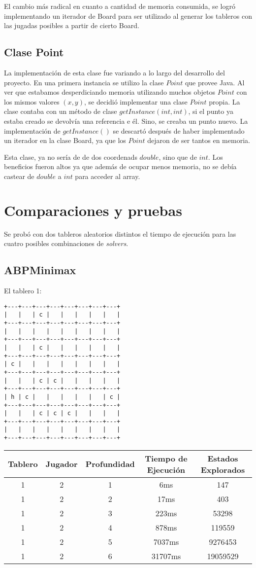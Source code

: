 \documentclass[10pt,a4paper,notitlepage]{article}
\begin{document}
    El cambio más radical en cuanto a cantidad de memoria consumida, se logró implementando un iterador de Board para ser utilizado al generar los tableros con
    las jugadas posibles a partir de cierto Board.

  \subsection{Clase Point}
    La implementación de esta clase fue variando a lo largo del desarrollo del proyecto. En una primera instancia se utilizo la clase $Point$ que provee Java.
    Al ver que estabamos desperdiciando memoria utilizando muchos objetos $Point$ con los mismos valores $(x, y)$, se decidió implementar una clase $Point$ propia.
    La clase contaba con un método de clase $getInstance(int, int)$, si el punto ya estaba creado se devolvía una referencia e él. Sino, se creaba un punto nuevo.
    La implementación de $getInstance()$ se descartó después de haber implementado un iterador en la clase Board, ya que los $Point$ dejaron de ser tantos en memoria.

    Esta clase, ya no sería de de dos coordenads $double$, sino que de $int$. Los beneficios fueron altos ya que además de ocupar menos memoria, no se debía castear de $double$ a $int$ para acceder al array.


\section{Comparaciones y pruebas}


Se probó con dos tableros aleatorios distintos el tiempo de ejecución para las cuatro posibles combinaciones de \textit{solvers}.

\subsection{ABPMinimax}
El tablero 1:
\begin{verbatim}
+---+---+---+---+---+---+---+---+
|   |   | c |   |   |   |   |   |
+---+---+---+---+---+---+---+---+
|   |   |   |   |   |   |   |   |
+---+---+---+---+---+---+---+---+
|   |   | c |   |   |   |   |   |
+---+---+---+---+---+---+---+---+
| c |   |   |   |   |   |   |   |
+---+---+---+---+---+---+---+---+
|   |   | c | c |   |   |   |   |
+---+---+---+---+---+---+---+---+
| h | c |   |   |   |   |   | c |
+---+---+---+---+---+---+---+---+
|   |   | c | c | c |   |   |   |
+---+---+---+---+---+---+---+---+
|   |   |   |   |   |   |   |   |
+---+---+---+---+---+---+---+---+
\end{verbatim}
\begin{tabular}{|c|c|c|c|c|}
\hline
Tablero & Jugador & Profundidad & Tiempo de Ejecución & Estados Explorados \\
\hline
\hline
1&2&1&6ms&147\\
\hline
1&2&2&17ms&403\\
\hline
1&2&3&223ms&53298\\
\hline
1&2&4&878ms&119559\\
\hline
1&2&5&7037ms&9276453\\
\hline
1&2&6&31707ms&19059529\\
\hline
\end{tabular}
\end{document}
